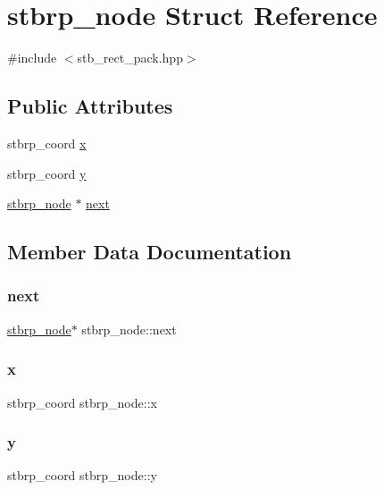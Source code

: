 \hypertarget{structstbrp__node}{}\section{stbrp\+\_\+node Struct Reference}
\label{structstbrp__node}


{\ttfamily \#include $<$stb\+\_\+rect\+\_\+pack.\+hpp$>$}

\subsection*{Public Attributes}
\begin{DoxyCompactItemize}
\item 
stbrp\+\_\+coord \hyperlink{structstbrp__node_a45ab31a88025db27d08040d715b129ea}{x}
\item 
stbrp\+\_\+coord \hyperlink{structstbrp__node_ad0415cb102a4f37aa45073653307e67e}{y}
\item 
\hyperlink{structstbrp__node}{stbrp\+\_\+node} $\ast$ \hyperlink{structstbrp__node_a933cb2dd6cddc4fcaf10e3b40634bed4}{next}
\end{DoxyCompactItemize}


\subsection{Member Data Documentation}
\hypertarget{structstbrp__node_a933cb2dd6cddc4fcaf10e3b40634bed4}{}\label{structstbrp__node_a933cb2dd6cddc4fcaf10e3b40634bed4} 
\subsubsection{\texorpdfstring{next}{next}}
{\footnotesize\ttfamily \hyperlink{structstbrp__node}{stbrp\+\_\+node}$\ast$ stbrp\+\_\+node\+::next}

\hypertarget{structstbrp__node_a45ab31a88025db27d08040d715b129ea}{}\label{structstbrp__node_a45ab31a88025db27d08040d715b129ea} 
\subsubsection{\texorpdfstring{x}{x}}
{\footnotesize\ttfamily stbrp\+\_\+coord stbrp\+\_\+node\+::x}

\hypertarget{structstbrp__node_ad0415cb102a4f37aa45073653307e67e}{}\label{structstbrp__node_ad0415cb102a4f37aa45073653307e67e} 
\subsubsection{\texorpdfstring{y}{y}}
{\footnotesize\ttfamily stbrp\+\_\+coord stbrp\+\_\+node\+::y}

